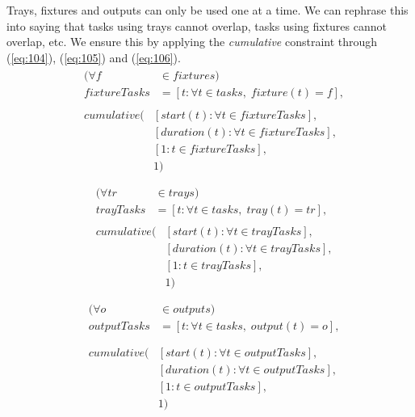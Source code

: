  \noindent Trays, fixtures and outputs can only be used one at a time. We can rephrase this into saying that tasks using trays cannot overlap, tasks using fixtures cannot overlap, etc. We ensure this by applying the \emph{cumulative} constraint through (\ref{eq:104}), (\ref{eq:105}) and (\ref{eq:106}).
 \begin{equation}
 \begin{aligned}\label{eq:104}
 &\begin{aligned}
 (\forall f &\in fixtures) \\
 fixtureTasks &= [t : \forall t \in tasks, \; fixture(t) = f], 
 \end{aligned}\\
 &\begin{aligned}
 cumulative(&[start(t) : \forall t \in fixtureTasks],\\
 &[duration(t) : \forall t \in fixtureTasks],\\
 &[1 : t \in fixtureTasks],\\
 &1)
 \end{aligned}\\
 \end{aligned}
 \end{equation}
 \begin{equation}
 \begin{aligned}\label{eq:105}
 &\begin{aligned}
 (\forall tr &\in trays) \\
 trayTasks &= [t : \forall t \in tasks, \; tray(t) = tr], 
 \end{aligned}\\
 &\begin{aligned}
 cumulative(&[start(t) : \forall t \in trayTasks],\\
 &[duration(t) : \forall t \in trayTasks],\\
 &[1 : t \in trayTasks],\\
 &1)
 \end{aligned}\\
 \end{aligned}
 \end{equation}
 \begin{equation}
 \begin{aligned}\label{eq:106}
 &\begin{aligned}
 (\forall o &\in outputs) \\
 outputTasks &= [t : \forall t \in tasks, \; output(t) = o], \\
 \end{aligned}\\
 &\begin{aligned}
 cumulative(&[start(t) : \forall t \in outputTasks], \\
 &[duration(t) : \forall t \in outputTasks], \\
 &[1 : t \in outputTasks], \\
 &1)
 \end{aligned}\\
 \end{aligned}
 \end{equation}

